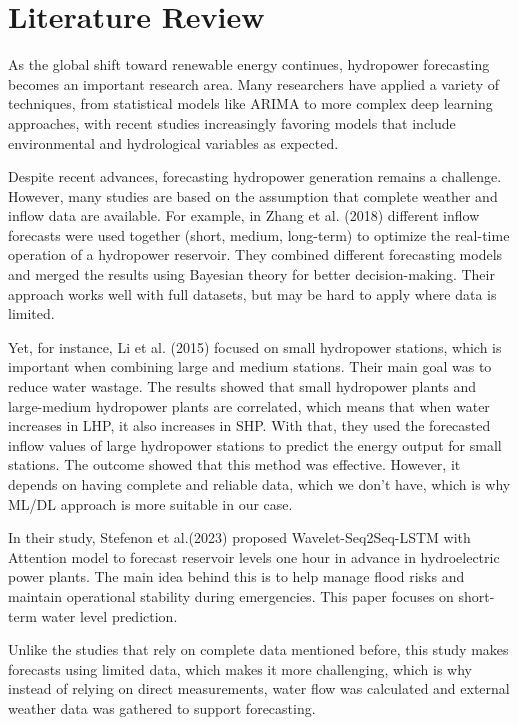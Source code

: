 \documentclass[12pt]{article}
\begin{document}
\newpage
\section{Literature Review}
\label{sec:Literature Review}
As the global shift toward renewable energy continues, hydropower forecasting becomes an important research area. Many researchers have applied a variety of techniques, from statistical models like ARIMA to more complex deep learning approaches, with recent studies increasingly favoring models that include environmental and hydrological variables as expected.

Despite recent advances, forecasting hydropower generation remains a challenge. However, many studies are based on the assumption that complete weather and inflow data are available. For example, in Zhang et al. (2018) different inflow forecasts were used together (short, medium, long-term) to optimize the real-time operation of a hydropower reservoir. They combined different forecasting models and merged the results using Bayesian theory for better decision-making. Their approach works well with full datasets, but may be hard to apply where data is limited.

Yet, for instance, Li et al. (2015) focused on small hydropower stations, which is important when combining large and medium stations. Their main goal was to reduce water wastage. The results showed that small hydropower plants and large-medium hydropower plants are correlated, which means that when water increases in LHP, it also increases in SHP. With that, they used the forecasted inflow values of large hydropower stations to predict the energy output for small stations. The outcome showed that this method was effective. However, it depends on having complete and reliable data, which we don't have, which is why ML/DL approach is more suitable in our case.

In their study, Stefenon et al.(2023) proposed Wavelet-Seq2Seq-LSTM with Attention model to forecast reservoir levels one hour in advance in hydroelectric power plants. The main idea behind this is to help manage flood risks and maintain operational stability during emergencies. This paper focuses on short-term water level prediction.

Unlike the studies that rely on complete data mentioned before, this study makes forecasts using limited data, which makes it more challenging, which is why instead of relying on direct measurements, water flow was calculated and external weather data was gathered to support forecasting. 
\end{document}
